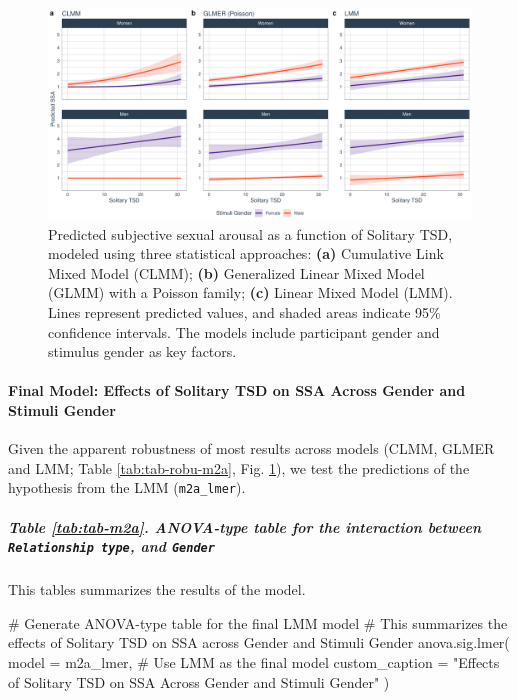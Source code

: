 \documentclass[
  bookmarksnumbered]{article}
\newenvironment{Shaded}{\begin{snugshade}}{\end{snugshade}}
\newcommand{\AttributeTok}[1]{\textcolor[rgb]{0.80,0.80,0.80}{#1}}
\newcommand{\CommentTok}[1]{\textcolor[rgb]{0.50,0.62,0.50}{#1}}
\newcommand{\FunctionTok}[1]{\textcolor[rgb]{0.94,0.94,0.56}{#1}}
\newcommand{\NormalTok}[1]{\textcolor[rgb]{0.80,0.80,0.80}{#1}}
\newcommand{\StringTok}[1]{\textcolor[rgb]{0.80,0.58,0.58}{#1}}
\begin{document}
\begin{figure}
\centering
\includegraphics{Sexual_Desire_Arousal_files/figure-latex/preds-m2a-1.pdf}
\caption{\label{fig:preds-m2a}Predicted subjective sexual arousal as a function of Solitary TSD, modeled using three statistical approaches: \textbf{(a)} Cumulative Link Mixed Model (CLMM); \textbf{(b)} Generalized Linear Mixed Model (GLMM) with a Poisson family; \textbf{(c)} Linear Mixed Model (LMM). Lines represent predicted values, and shaded areas indicate 95\% confidence intervals. The models include participant gender and stimulus gender as key factors.}
\end{figure}

\paragraph{Final Model: Effects of Solitary TSD on SSA Across Gender and Stimuli Gender}\label{final-model-effects-of-solitary-tsd-on-ssa-across-gender-and-stimuli-gender}

Given the apparent robustness of most results across models (CLMM, GLMER and LMM; Table \ref{tab:tab-robu-m2a}, Fig. \ref{fig:preds-m2a}), we test the predictions of the hypothesis from the LMM (\texttt{m2a\_lmer}).

\subparagraph{\texorpdfstring{Table \ref{tab:tab-m2a}. ANOVA-type table for the interaction between \texttt{Relationship\ type}, and \texttt{Gender}}{Table \ref{tab:tab-m2a}. ANOVA-type table for the interaction between Relationship type, and Gender}}\label{table-reftabtab-m2a.-anova-type-table-for-the-interaction-between-relationship-type-and-gender}

This tables summarizes the results of the model.

\begin{Shaded}
\begin{Highlighting}[]
\CommentTok{\# Generate ANOVA{-}type table for the final LMM model}
\CommentTok{\# This summarizes the effects of Solitary TSD on SSA across Gender and Stimuli Gender}
\FunctionTok{anova.sig.lmer}\NormalTok{(}
  \AttributeTok{model =}\NormalTok{ m2a\_lmer, }\CommentTok{\# Use LMM as the final model}
  \AttributeTok{custom\_caption =} \StringTok{"Effects of Solitary TSD on SSA Across Gender and Stimuli Gender"}
\NormalTok{)}
\end{Highlighting}
\end{Shaded}
\end{document}
